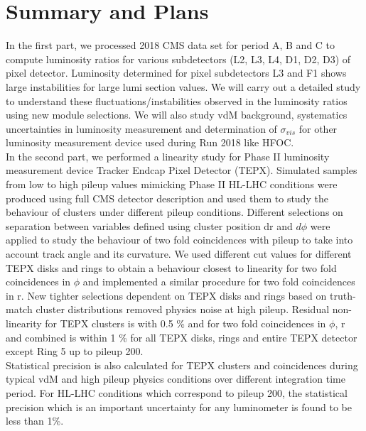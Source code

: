 \section{Summary and Plans} 
\label{sec:conclusion}

In the first part, we processed 2018 CMS data set for period A, B and C to compute luminosity ratios for various subdetectors (L2, L3, L4, D1, D2, D3) of pixel detector. Luminosity determined for pixel subdetectors L3 and F1 shows large instabilities for large lumi section values. We will carry out a detailed study to understand these fluctuations/instabilities observed in the luminosity ratios using new module selections. We will also study vdM background, systematics uncertainties in luminosity measurement and determination of $\sigma_{vis}$ for other luminosity measurement device used during Run 2018 like HFOC.\\

In the second part, we performed a linearity study for Phase II luminosity measurement device Tracker Endcap Pixel Detector (TEPX). Simulated samples from low to high pileup values mimicking Phase II HL-LHC conditions were produced using full CMS detector description and used them to study the behaviour of clusters under different pileup conditions. Different selections on separation between variables defined using cluster position dr and $d\phi$ were applied to study the behaviour of two fold coincidences with pileup to take into account track angle and its curvature. We used different cut values for different TEPX disks and rings to obtain a behaviour closest to linearity for two fold coincidences in $\phi$ and implemented a similar procedure for two fold coincidences in r. New tighter selections dependent on TEPX disks and rings based on truth-match cluster distributions removed physics noise at high pileup. Residual non-linearity for TEPX clusters is with 0.5 \% and for two fold coincidences in $\phi$, r and combined is within 1 \% for all TEPX disks, rings and entire TEPX detector except Ring 5 up to pileup 200.\\
 
Statistical precision is also calculated for TEPX clusters and coincidences during typical vdM and high pileup physics conditions over different integration time period. For HL-LHC conditions which correspond to pileup 200, the statistical precision which is an important uncertainty for any luminometer is found to be less than 1\%.

\clearpage\newpage
